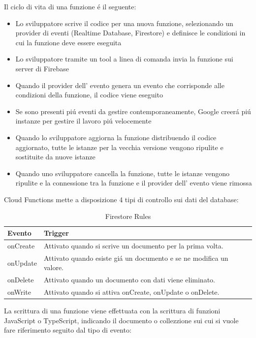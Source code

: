 Il ciclo di vita di una funzione \'e il seguente:
\begin{itemize}
  \item Lo sviluppatore scrive il codice per una nuova funzione, selezionando un provider di eventi (Realtime Database, Firestore) e definisce le condizioni in cui la funzione deve essere eseguita
  \item Lo sviluppatore tramite un tool a linea di comanda invia la funzione sui server di Firebase
  \item Quando il provider dell' evento genera un evento che corrisponde alle condizioni della funzione, il codice viene eseguito
  \item Se sono presenti pi\'u eventi da gestire contemporaneamente, Google creer\'a pi\'u instanze per gestire il lavoro pi\'u velocemente
  \item Quando lo sviluppatore aggiorna la funzione distribuendo il codice aggiornato, tutte le istanze per la vecchia versione vengono ripulite e sostituite da nuove istanze
  \item Quando uno sviluppatore cancella la funzione, tutte le istanze vengono ripulite e la connessione tra la funzione e il provider dell' evento viene rimossa
\end{itemize}


\newpage              %
Cloud Functions mette a disposizione 4 tipi di controllo sui dati del database:

\begin{table}[h!]
\begin{tabular}{|p{2cm}|p{12cm}|}
    \hline
    \textbf{Evento} & \textbf{Trigger} \\ \hline
    onCreate &  Attivato quando si scrive un documento per la prima volta.\\ \hline
    onUpdate &  Attivato quando esiste gi\'a un documento e se ne modifica un valore.\\ \hline
    onDelete &  Attivato quando un documento con dati viene eliminato.\\ \hline
    onWrite & Attivato quando si attiva onCreate, onUpdate o onDelete.\\ \hline

\end{tabular}
\caption[Firestore Rules ]{Firestore Rules}\label{tab:Firestore Rules}
\end{table}


La scrittura di una funzione viene effettuata con la scrittura di funzioni JavaScript o TypeScript, indicando il documento o collezzione sui cui si vuole fare riferimento seguito dal tipo di evento:



